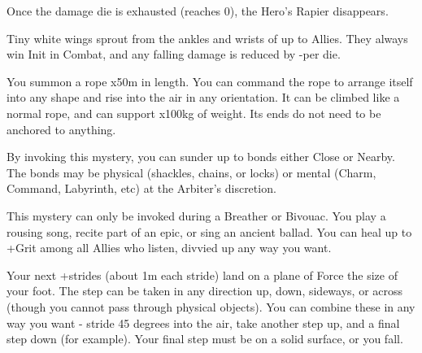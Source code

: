 {Once the damage die is exhausted (reaches 0), the Hero's Rapier disappears.

\MYSTERY [
  Name = Duelists' Wings,
  Link = arcana-mystery-duelists-wings,
  Paradigm = Biomancy,
  Save = n/a,
  Duration = Combat or \SUM Minutes,
  Target = Self or Close Target(s)
]

Tiny white wings sprout from the ankles and wrists of up to \DICE Allies.  They always win Init in Combat, and any falling damage is reduced by -\DICE per die.

\MYSTERY [
  Name = Ropework,
  Link = arcana-mystery-ropework,
  Paradigm = Entropy,
  Save = N,
  Duration = \SUM Minutes,
  Target = Close Target(s)
]

You summon a rope \DICE x50m in length.  You can command the rope to arrange itself into any shape and rise into the air in any orientation.  It can be climbed like a normal rope, and can support \DICE x100kg of weight.  Its ends do not need to be anchored to anything.

\MYSTERY [
  Name = Shatter Bonds,
  Link = arcana-mystery-shatter-bonds,
  Paradigm = Force,
  Save = n/a,
  Duration = Instant,
  Target = Close or Nearby
]

By invoking this mystery, you can sunder up to \DICE bonds either Close or Nearby.  The bonds may be physical (shackles, chains, or locks) or mental (Charm, Command, Labyrinth, etc) at the Arbiter's discretion.

\MYSTERY [
  Name = Skald's Tongue,
  Link = arcana-mystery-skalds-tongue,
  Paradigm = Entropy,
  Save = n/a,
  Duration = Breather or Bivouac,
  Target = Close Target(s)
]

This mystery can only be invoked during a Breather or Bivouac.  You play a rousing song, recite part of an epic, or sing an ancient ballad.  You can heal up to \SUMDICE+\DICE Grit among all Allies who listen, divvied up any way you want.

\MYSTERY [
  Name = Vaulting Step,
  Link = arcana-mystery-vaulting-step,
  Paradigm = Force,
  Save = N,
  Duration = Instant,
  Target = Self
]

Your next \DICE+\DICE strides (about 1m each stride) land on a plane of Force the size of your foot.  The step can be taken in any direction up, down, sideways, or across (though you cannot pass through physical objects).  You can combine these in any way you want - stride 45 degrees into the air, take another step up, and a final step down (for example).  Your final step must be on a solid surface, or you fall. 

}

